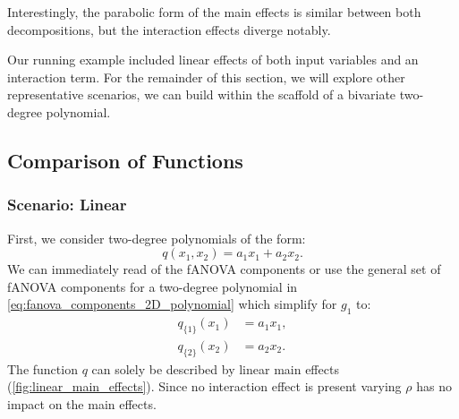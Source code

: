 Interestingly, the parabolic form of the main effects is similar between both decompositions, but the interaction effects diverge notably.\par
Our running example included linear effects of both input variables and an interaction term. For the remainder of this section, we will explore other representative scenarios, we can build within the scaffold of a bivariate two-degree polynomial.

\subsection{Comparison of Functions}
\subsubsection{Scenario: Linear}
First, we consider two-degree polynomials of the form:
$$q(x_1, x_2) = a_1 x_1 + a_2 x_2.$$
We can immediately read of the fANOVA components or use the general set of fANOVA components for a two-degree polynomial in \autoref{eq:fanova_components_2D_polynomial} which simplify for $g_1$ to:
\begin{align*}
    q_{\{1\}}(x_1) &= a_1 x_1, \\
    q_{\{2\}}(x_2) &= a_2 x_2.
\end{align*}
The function $q$ can solely be described by linear main effects (\autoref{fig:linear_main_effects}). Since no interaction effect is present varying $\rho$ has no impact on the main effects.

